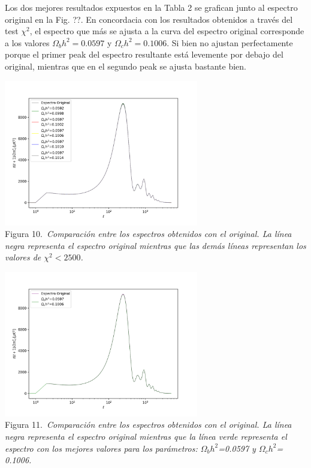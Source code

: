 \documentclass[twocolumn,letterpaper,spanish]{revtex4}
\numberwithin{equation}{section}
\begin{document}
Los dos mejores resultados expuestos en la Tabla 2 se grafican junto al espectro original en la Fig. ??. En concordacia con los resultados obtenidos a trav\'es del test $\chi^2$, el espectro que m\'as se ajusta a la curva del espectro original corresponde a los valores $\Omega_b h^2=0.0597$ y $\Omega_c h^2=0.1006$. Si bien no ajustan perfectamente porque el primer peak del espectro resultante est\'a levemente por debajo del original, mientras que en el segundo peak se ajusta bastante bien.

\begin{center}
   \includegraphics[width=85mm]{comparacion.png}\\
   Figura 10.\emph{\ Comparaci\'on entre los espectros obtenidos con el original. La l\'inea negra representa el espectro original mientras que las dem\'as l\'ineas representan los valores de $\chi^2<2500$.}%
\end{center}

\begin{center}
   \includegraphics[width=85mm]{comparacion2.png}\\
   Figura 11.\emph{\ Comparaci\'on entre los espectros obtenidos con el original. La l\'inea negra representa el espectro original mientras que la l\'inea verde representa el espectro con los mejores valores para los par\'ametros: $\Omega_b h^2$=0.0597 y $\Omega_c h^2$= 0.1006.}
\end{center}
\end{document}
